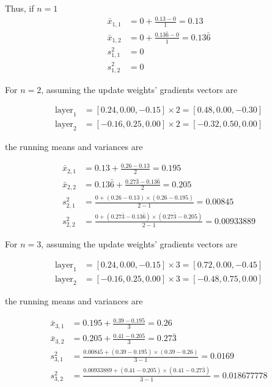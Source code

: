 \documentclass[MSc,english,french]{ulthese}
\begin{document}
Thus, if $n = 1$
\begin{align*}
\bar{x}_{1, 1} &= 0 + \frac{0.13 - 0}{1} = 0.13 \\
\bar{x}_{1, 2} &= 0 + \frac{0.13\bar{6} - 0}{1} = 0.13\bar{6}  \\
s^2_{1, 1} &= 0 \\
s^2_{1, 2} &= 0
\end{align*}

For $n=2$, assuming the update weights' gradients vectors are 

\begin{align*}
\text{layer}_1 &= [ 0.24, 0.00, -0.15] \times 2 = [ 0.48, 0.00, -0.30] \\
\text{layer}_2 &= [-0.16, 0.25, 0.00] \times 2 = [-0.32, 0.50, 0.00] 
\end{align*}

the running means and variances are

\begin{align*}
\bar{x}_{2, 1} &= 0.13 + \frac{0.26 - 0.13}{2} = 0.195 \\
\bar{x}_{2, 2} &= 0.13\bar{6} + \frac{0.27\bar{3} - 0.13\bar{6}}{2} =  0.205\\
s^2_{2, 1} &= \frac{0 + (0.26 - 0.13)\times(0.26 - 0.195)}{2 - 1} = 0.00845\\
s^2_{2, 2} &= \frac{0 + (0.27\bar{3} - 0.13\bar{6})\times(0.27\bar{3} - 0.205)}{2 - 1} = 0.00933889
\end{align*}

For $n=3$, assuming the update weights' gradients vectors are  

\begin{align*}
\text{layer}_1 &= [ 0.24, 0.00, -0.15] \times 3 = [ 0.72, 0.00, -0.45] \\
\text{layer}_2 &= [-0.16, 0.25, 0.00] \times 3 = [-0.48, 0.75, 0.00] 
\end{align*}

the running means and variances are

\begin{align*}
\bar{x}_{3, 1} &= 0.195 + \frac{0.39 - 0.195}{3} = 0.26 \\
\bar{x}_{3, 2} &= 0.205 + \frac{0.41 - 0.205}{3} = 0.27\bar{3} \\
s^2_{3, 1} &= \frac{0.00845 + (0.39 - 0.195)\times(0.39 - 0.26)}{3 - 1} = 0.0169\\
s^2_{3, 2} &= \frac{0.00933889 + (0.41 - 0.205)\times(0.41 - 0.27\bar{3})}{3 - 1} = 0.018677778
\end{align*}


\end{document}
